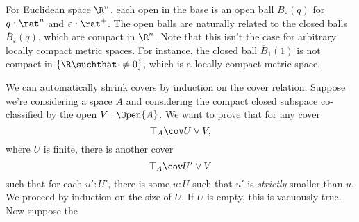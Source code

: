 For Euclidean space $\R^n$, each open in the base is an open ball $B_\varepsilon(q)$ for $q : \rat^n$ and $\varepsilon : \rat^+$. The open balls are naturally related to the closed balls $\overline{B}_\varepsilon(q)$, which are compact in $\R^n$. Note that this isn't the case for arbitrary locally compact metric spaces. For instance, the closed ball $\overline{B}_1(1)$ is not compact in $\{ \R \suchthat \cdot \neq 0 \}$, which is a locally compact metric space.

We can automatically shrink covers by induction on the cover relation. Suppose we're considering a space $A$ and considering the compact closed subspace co-classified by the open $V : \Open{A}$. We want to prove that for any cover
\[
\top_A \cov U \vee V,
\]
where $U$ is finite, there is another cover
\[
\top_A \cov U' \vee V
\]
such that for each $u' : U'$, there is some $u : U$ such that $u'$ is \emph{strictly} smaller than $u$. We proceed by induction on the size of $U$. If $U$ is empty, this is vacuously true. Now suppose the 